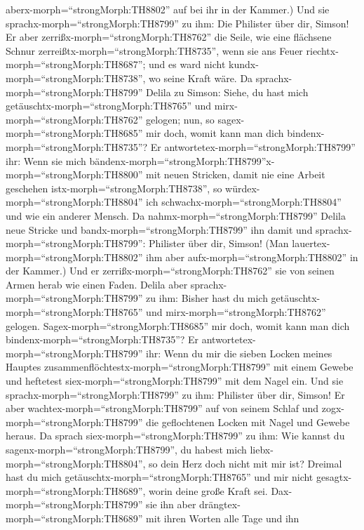 aberx-morph=``strongMorph:TH8802'' auf bei ihr in der Kammer.) Und sie
sprachx-morph=``strongMorph:TH8799'' zu ihm: Die Philister über dir,
Simson! Er aber zerrißx-morph=``strongMorph:TH8762'' die Seile, wie eine
flächsene Schnur zerreißtx-morph=``strongMorph:TH8735'', wenn sie ans
Feuer riechtx-morph=``strongMorph:TH8687''; und es ward nicht
kundx-morph=``strongMorph:TH8738'', wo seine Kraft wäre. 
Da sprachx-morph=``strongMorph:TH8799'' Delila zu Simson: Siehe, du hast
mich getäuschtx-morph=``strongMorph:TH8765'' und
mirx-morph=``strongMorph:TH8762'' gelogen; nun, so
sagex-morph=``strongMorph:TH8685'' mir doch, womit kann man dich
bindenx-morph=``strongMorph:TH8735''?  Er
antwortetex-morph=``strongMorph:TH8799'' ihr: Wenn sie mich
bändenx-morph=``strongMorph:TH8799''x-morph=``strongMorph:TH8800'' mit
neuen Stricken, damit nie eine Arbeit geschehen
istx-morph=``strongMorph:TH8738'', so
würdex-morph=``strongMorph:TH8804'' ich
schwachx-morph=``strongMorph:TH8804'' und wie ein anderer Mensch.
 Da nahmx-morph=``strongMorph:TH8799'' Delila neue Stricke
und bandx-morph=``strongMorph:TH8799'' ihn damit und
sprachx-morph=``strongMorph:TH8799'': Philister über dir, Simson! (Man
lauertex-morph=``strongMorph:TH8802'' ihm aber
aufx-morph=``strongMorph:TH8802'' in der Kammer.) Und er
zerrißx-morph=``strongMorph:TH8762'' sie von seinen Armen herab wie
einen Faden.  Delila aber
sprachx-morph=``strongMorph:TH8799'' zu ihm: Bisher hast du mich
getäuschtx-morph=``strongMorph:TH8765'' und
mirx-morph=``strongMorph:TH8762'' gelogen.
Sagex-morph=``strongMorph:TH8685'' mir doch, womit kann man dich
bindenx-morph=``strongMorph:TH8735''? Er
antwortetex-morph=``strongMorph:TH8799'' ihr: Wenn du mir die sieben
Locken meines Hauptes zusammenflöchtestx-morph=``strongMorph:TH8799''
mit einem Gewebe und heftetest siex-morph=``strongMorph:TH8799'' mit dem
Nagel ein.  Und sie sprachx-morph=``strongMorph:TH8799'' zu
ihm: Philister über dir, Simson! Er aber
wachtex-morph=``strongMorph:TH8799'' auf von seinem Schlaf und
zogx-morph=``strongMorph:TH8799'' die geflochtenen Locken mit Nagel und
Gewebe heraus.  Da sprach siex-morph=``strongMorph:TH8799''
zu ihm: Wie kannst du sagenx-morph=``strongMorph:TH8799'', du habest
mich liebx-morph=``strongMorph:TH8804'', so dein Herz doch nicht mit mir
ist? Dreimal hast du mich getäuschtx-morph=``strongMorph:TH8765'' und
mir nicht gesagtx-morph=``strongMorph:TH8689'', worin deine große Kraft
sei.  Dax-morph=``strongMorph:TH8799'' sie ihn aber
drängtex-morph=``strongMorph:TH8689'' mit ihren Worten alle Tage und ihn
